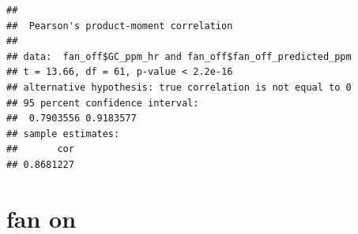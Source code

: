 \documentclass[
]{article}
\newenvironment{Shaded}{\begin{snugshade}}{\end{snugshade}}
\newcommand{\AttributeTok}[1]{\textcolor[rgb]{0.13,0.29,0.53}{#1}}
\newcommand{\FunctionTok}[1]{\textcolor[rgb]{0.13,0.29,0.53}{\textbf{#1}}}
\newcommand{\NormalTok}[1]{#1}
\newcommand{\SpecialCharTok}[1]{\textcolor[rgb]{0.81,0.36,0.00}{\textbf{#1}}}
\newcommand{\StringTok}[1]{\textcolor[rgb]{0.31,0.60,0.02}{#1}}
\begin{document}
\begin{Shaded}
\end{Shaded}

\begin{verbatim}
## 
##  Pearson's product-moment correlation
## 
## data:  fan_off$GC_ppm_hr and fan_off$fan_off_predicted_ppm
## t = 13.66, df = 61, p-value < 2.2e-16
## alternative hypothesis: true correlation is not equal to 0
## 95 percent confidence interval:
##  0.7903556 0.9183577
## sample estimates:
##       cor 
## 0.8681227
\end{verbatim}

\section{fan on}\label{fan-on}
\end{document}
